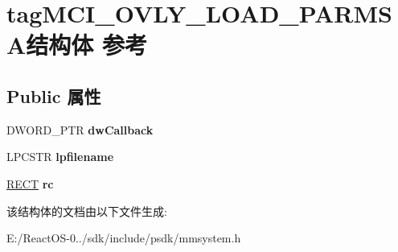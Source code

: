 \hypertarget{structtag_m_c_i___o_v_l_y___l_o_a_d___p_a_r_m_s_a}{}\section{tag\+M\+C\+I\+\_\+\+O\+V\+L\+Y\+\_\+\+L\+O\+A\+D\+\_\+\+P\+A\+R\+M\+S\+A结构体 参考}
\label{structtag_m_c_i___o_v_l_y___l_o_a_d___p_a_r_m_s_a}
\subsection*{Public 属性}
\begin{DoxyCompactItemize}
\item 
\mbox{\label{structtag_m_c_i___o_v_l_y___l_o_a_d___p_a_r_m_s_a_a26295a6e9df48b234b6710a2e904178b}} 
D\+W\+O\+R\+D\+\_\+\+P\+TR {\bfseries dw\+Callback}
\item 
\mbox{\label{structtag_m_c_i___o_v_l_y___l_o_a_d___p_a_r_m_s_a_aaab4cfdaf1f3493a08b62e842c1bfce9}} 
L\+P\+C\+S\+TR {\bfseries lpfilename}
\item 
\mbox{\label{structtag_m_c_i___o_v_l_y___l_o_a_d___p_a_r_m_s_a_a762676d2c488413f3d9567275ffe365c}} 
\hyperlink{structtag_r_e_c_t}{R\+E\+CT} {\bfseries rc}
\end{DoxyCompactItemize}


该结构体的文档由以下文件生成\+:\begin{DoxyCompactItemize}
\item 
E\+:/\+React\+O\+S-\/0../sdk/include/psdk/mmsystem.\+h\end{DoxyCompactItemize}
